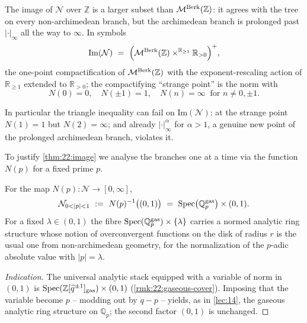 \begin{theorem}
\label{thm:22:image}
The image of $\mathcal N$ over $\mathbb Z$ is a larger subset than
$\mathcal{M}^{\mathrm{Berk}}(\mathbb Z)$: it agrees with the tree on every non-archimedean branch,
but the archimedean branch is prolonged past $|\cdot|_\infty$ all the way to
$\infty$. In symbols
\begin{equation}
\label{eq:22:image-formula}
\mathrm{Im}(\mathcal N)\ =\ \Bigl(\mathcal{M}^{\mathrm{Berk}}(\mathbb Z) \times^{\mathbb R_{\ge1}}
\mathbb R_{>0}\Bigr)^{+},
\end{equation}
the one-point compactification of $\mathcal{M}^{\mathrm{Berk}}(\mathbb Z)$ with the exponent-rescaling
action of $\mathbb R_{\ge1}$ extended to $\mathbb R_{>0}$; the compactifying
``strange point'' is the norm with
\begin{equation*}
N(0)=0,\quad N(\pm1)=1,\quad N(n)=\infty\ \text{ for } n\neq0,\pm1 .
\end{equation*}
\end{theorem}

\begin{remark}
\label{rmk:22:triangle-fails}
In particular the triangle inequality can fail on $\mathrm{Im}(\mathcal N)$: at
the strange point $N(1)=1$ but $N(2)=\infty$; and already $|\cdot|_\infty^\alpha$
for $\alpha>1$, a genuine new point of the prolonged archimedean branch,
violates it.
\end{remark}

To justify \cref{thm:22:image} we analyse the branches one at a time via the
function $N(p)$ for a fixed prime $p$.

\begin{proposition}
\label{prop:22:p-branch}
For the map $N(p)\colon\mathcal N\to[0,\infty]$,
\begin{equation*}
\mathcal N_{0<|p|<1}\ :=\ N(p)^{-1}\bigl((0,1)\bigr)\ =\ \Spec\bigl(\mathbb
Q_{p}^{\gasx}\bigr)\times(0,1).
\end{equation*}
For a fixed $\lambda\in(0,1)$ the fibre $\operatorname{Spec}(\mathbb Q_p^{\mathrm{gas}})\times
\{\lambda\}$ carries a normed analytic ring structure whose notion of
overconvergent functions on the disk of radius $r$ is the usual one from
non-archimedean geometry, for the normalization of the $p$-adic absolute value
with $|p|=\lambda$.
\end{proposition}

\begin{proof}[Indication]
The universal analytic stack equipped with a variable of norm in $(0,1)$ is
$\operatorname{Spec}(\mathbb Z[\widehat q^{\pm1}]_{\mathrm{gas}})\times(0,1)$ (\cref{rmk:22:gaseous-cover}).
Imposing that the variable become $p$ -- modding out by $q-p$ -- yields, as in
\cref{lec:14}, the gaseous analytic ring structure on $\mathbb Q_p$; the second
factor $(0,1)$ is unchanged.
\end{proof}


